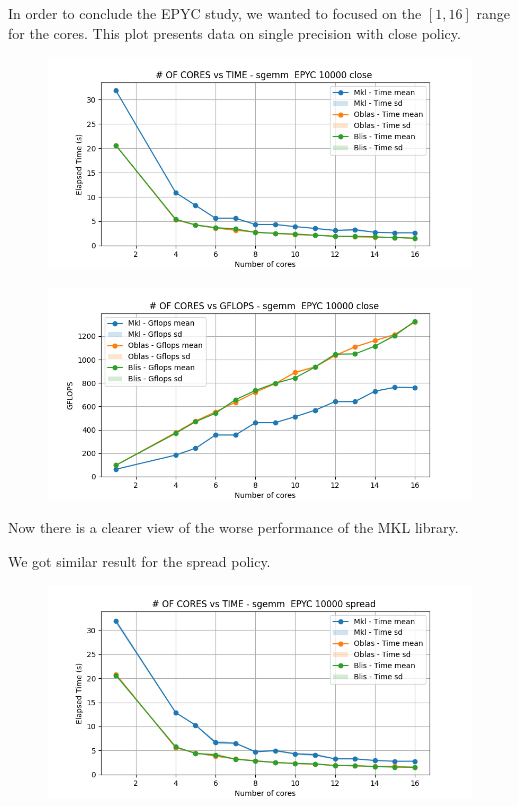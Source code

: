 \documentclass[12pt, titlepage]{report}
\begin{document}
In order to conclude the EPYC study, we wanted to focused on the $[1,16]$ range for the cores.
This plot presents data on single precision with close policy.
\begin{figure}[H]
    \centering
    \includegraphics[width=\textwidth]{EPYC scalability deep/sgemm__EPYC_10000_close_time.png}
\end{figure}

\begin{figure}[H]
    \centering
    \includegraphics[width=\textwidth]{EPYC scalability deep/sgemm__EPYC_10000_close_gflops.png}
\end{figure}
Now there is a clearer view of the worse performance of the MKL library. 

We got similar result for the spread policy.
\begin{figure}[H]
    \centering
    \includegraphics[width=\textwidth]{EPYC scalability deep/sgemm__EPYC_10000_spread_time.png}
\end{figure}
\end{document}
